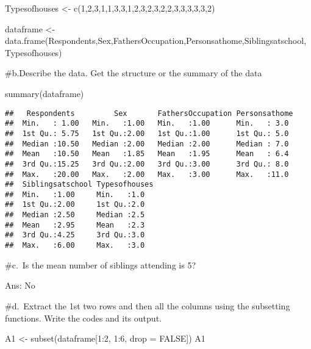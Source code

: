 \documentclass[
]{article}
\newenvironment{Shaded}{\begin{snugshade}}{\end{snugshade}}
\newcommand{\AttributeTok}[1]{\textcolor[rgb]{0.77,0.63,0.00}{#1}}
\newcommand{\ConstantTok}[1]{\textcolor[rgb]{0.00,0.00,0.00}{#1}}
\newcommand{\DecValTok}[1]{\textcolor[rgb]{0.00,0.00,0.81}{#1}}
\newcommand{\FunctionTok}[1]{\textcolor[rgb]{0.00,0.00,0.00}{#1}}
\newcommand{\NormalTok}[1]{#1}
\newcommand{\OtherTok}[1]{\textcolor[rgb]{0.56,0.35,0.01}{#1}}
\newcommand{\SpecialCharTok}[1]{\textcolor[rgb]{0.00,0.00,0.00}{#1}}
\begin{document}
\begin{Shaded}
\begin{Highlighting}[]
\NormalTok{Typesofhouses }\OtherTok{\textless{}{-}} \FunctionTok{c}\NormalTok{(}\DecValTok{1}\NormalTok{,}\DecValTok{2}\NormalTok{,}\DecValTok{3}\NormalTok{,}\DecValTok{1}\NormalTok{,}\DecValTok{1}\NormalTok{,}\DecValTok{3}\NormalTok{,}\DecValTok{3}\NormalTok{,}\DecValTok{1}\NormalTok{,}\DecValTok{2}\NormalTok{,}\DecValTok{3}\NormalTok{,}\DecValTok{2}\NormalTok{,}\DecValTok{3}\NormalTok{,}\DecValTok{2}\NormalTok{,}\DecValTok{2}\NormalTok{,}\DecValTok{3}\NormalTok{,}\DecValTok{3}\NormalTok{,}\DecValTok{3}\NormalTok{,}\DecValTok{3}\NormalTok{,}\DecValTok{3}\NormalTok{,}\DecValTok{2}\NormalTok{)}

\NormalTok{dataframe }\OtherTok{\textless{}{-}} \FunctionTok{data.frame}\NormalTok{(Respondents,Sex,FathersOccupation,Personsathome,Siblingsatschool,Typesofhouses)}
\end{Highlighting}
\end{Shaded}

\#b.Describe the data. Get the structure or the summary of the data

\begin{Shaded}
\begin{Highlighting}[]
\FunctionTok{summary}\NormalTok{(dataframe)}
\end{Highlighting}
\end{Shaded}

\begin{verbatim}
##   Respondents         Sex       FathersOccupation Personsathome 
##  Min.   : 1.00   Min.   :1.00   Min.   :1.00      Min.   : 3.0  
##  1st Qu.: 5.75   1st Qu.:2.00   1st Qu.:1.00      1st Qu.: 5.0  
##  Median :10.50   Median :2.00   Median :2.00      Median : 7.0  
##  Mean   :10.50   Mean   :1.85   Mean   :1.95      Mean   : 6.4  
##  3rd Qu.:15.25   3rd Qu.:2.00   3rd Qu.:3.00      3rd Qu.: 8.0  
##  Max.   :20.00   Max.   :2.00   Max.   :3.00      Max.   :11.0  
##  Siblingsatschool Typesofhouses
##  Min.   :1.00     Min.   :1.0  
##  1st Qu.:2.00     1st Qu.:2.0  
##  Median :2.50     Median :2.5  
##  Mean   :2.95     Mean   :2.3  
##  3rd Qu.:4.25     3rd Qu.:3.0  
##  Max.   :6.00     Max.   :3.0
\end{verbatim}

\#c.~Is the mean number of siblings attending is 5?

Ans: No

\#d.~Extract the 1st two rows and then all the columns using the
subsetting functions. Write the codes and its output.

\begin{Shaded}
\begin{Highlighting}[]
\NormalTok{A1 }\OtherTok{\textless{}{-}} \FunctionTok{subset}\NormalTok{(dataframe[}\DecValTok{1}\SpecialCharTok{:}\DecValTok{2}\NormalTok{, }\DecValTok{1}\SpecialCharTok{:}\DecValTok{6}\NormalTok{, }\AttributeTok{drop =} \ConstantTok{FALSE}\NormalTok{])}
\NormalTok{A1}
\end{Highlighting}
\end{Shaded}
\end{document}
